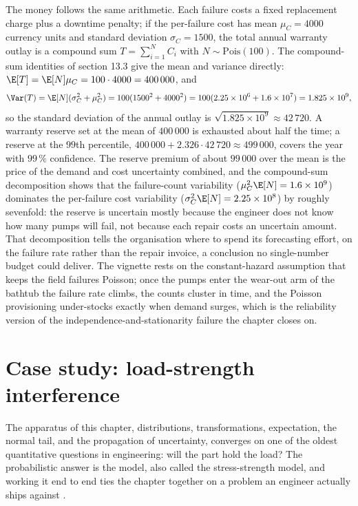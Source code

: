The money follows the same arithmetic. Each failure costs a fixed
replacement charge plus a downtime penalty; if the per-failure cost has
mean $\mu_{C} = 4000$ currency units and standard deviation $\sigma_{C} =
1500$, the total annual warranty outlay is a compound sum $T =
\sum_{i=1}^{N} C_{i}$ with $N \sim \mathrm{Pois}(100)$. The compound-sum
identities of section 13.3 give the mean and variance directly:
$\E[T] = \E[N]\mu_{C} = 100 \cdot 4000 = 400\,000$, and
\[
\Var(T) = \E[N](\sigma_{C}^{2} + \mu_{C}^{2})
= 100(1500^{2} + 4000^{2}) = 100(2.25 \times 10^{6} + 1.6 \times 10^{7})
= 1.825 \times 10^{9},
\]
so the standard deviation of the annual outlay is $\sqrt{1.825 \times
10^{9}} \approx 42\,720$. A warranty reserve set at the mean of
$400\,000$ is exhausted about half the time; a reserve at the $99$th
percentile, $400\,000 + 2.326 \cdot 42\,720 \approx 499\,000$, covers the
year with $99\,\%$ confidence. The reserve premium of about $99\,000$ over
the mean is the price of the demand and cost uncertainty combined, and
the compound-sum decomposition shows that the failure-count variability
($\mu_{C}^{2}\E[N] = 1.6 \times 10^{9}$) dominates the per-failure cost
variability ($\sigma_{C}^{2}\E[N] = 2.25 \times 10^{8}$) by roughly
sevenfold: the reserve is uncertain mostly because the engineer does not
know how many pumps will fail, not because each repair costs an uncertain
amount. That decomposition tells the organisation where to spend its
forecasting effort, on the failure rate rather than the repair invoice, a
conclusion no single-number budget could deliver. The vignette rests on
the constant-hazard assumption that keeps the field failures Poisson;
once the pumps enter the wear-out arm of the bathtub the failure rate
climbs, the counts cluster in time, and the Poisson provisioning
under-stocks exactly when demand surges, which is the reliability version
of the independence-and-stationarity failure the chapter closes on.

\section{Case study: load-strength interference}\label{sec:vol02:ch13:case-study}

The apparatus of this chapter, distributions, transformations,
expectation, the normal tail, and the propagation of uncertainty,
converges on one of the oldest quantitative questions in engineering:
will the part hold the load? The probabilistic answer is the
 model, also called the
stress-strength model, and working it end to end ties the chapter
together on a problem an engineer actually ships against
\cite[ch.~5]{text:ross-probability}.

